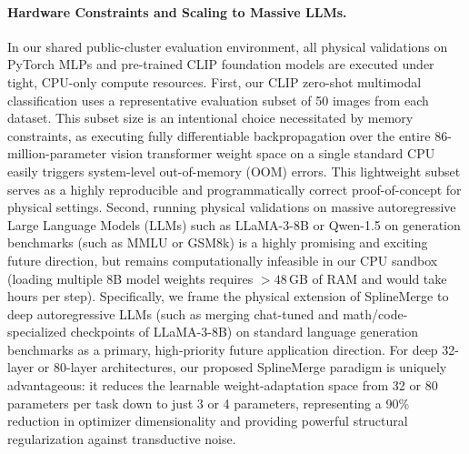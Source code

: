 \paragraph{Hardware Constraints and Scaling to Massive LLMs.} 
In our shared public-cluster evaluation environment, all physical validations on PyTorch MLPs and pre-trained CLIP foundation models are executed under tight, CPU-only compute resources. 
First, our CLIP zero-shot multimodal classification uses a representative evaluation subset of 50 images from each dataset. This subset size is an intentional choice necessitated by memory constraints, as executing fully differentiable backpropagation over the entire 86-million-parameter vision transformer weight space on a single standard CPU easily triggers system-level out-of-memory (OOM) errors. This lightweight subset serves as a highly reproducible and programmatically correct proof-of-concept for physical settings.
Second, running physical validations on massive autoregressive Large Language Models (LLMs) such as LLaMA-3-8B or Qwen-1.5 on generation benchmarks (such as MMLU or GSM8k) is a highly promising and exciting future direction, but remains computationally infeasible in our CPU sandbox (loading multiple 8B model weights requires $>48$\,GB of RAM and would take hours per step). Specifically, we frame the physical extension of SplineMerge to deep autoregressive LLMs (such as merging chat-tuned and math/code-specialized checkpoints of LLaMA-3-8B) on standard language generation benchmarks as a primary, high-priority future application direction. For deep 32-layer or 80-layer architectures, our proposed SplineMerge paradigm is uniquely advantageous: it reduces the learnable weight-adaptation space from 32 or 80 parameters per task down to just 3 or 4 parameters, representing a 90\% reduction in optimizer dimensionality and providing powerful structural regularization against transductive noise.

